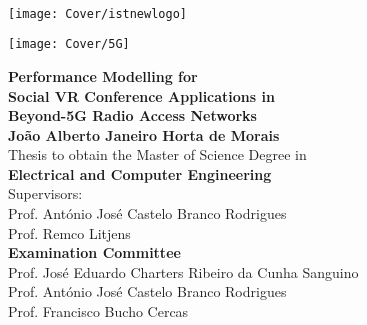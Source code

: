 \setcounter{page}{1} 


\thispagestyle{empty}
\begin{flushleft} ~\\ \vspace{-12mm} \hspace{-12mm}  \texttt{[image: Cover/istnewlogo]} 
\vspace{10mm}
\\ \begin{center} \texttt{[image: Cover/5G]}  \end{center} %
 \vspace{5mm}
\centering
\LARGE \textbf{Performance Modelling for \\Social VR Conference Applications in\\Beyond-5G Radio Access Networks}
\\ \vspace{15mm}
\Large \textbf{Jo{\~a}o Alberto Janeiro Horta de Morais} \\
\vspace{15mm}
\large Thesis to obtain the Master of Science Degree in
\\ \vspace{2mm}
\LARGE \textbf{Electrical and Computer Engineering}
\\ \vspace{10mm}
\large Supervisors:\\
Prof. Ant{\'o}nio Jos{\'e} Castelo Branco Rodrigues \\
Prof. Remco Litjens \\   
\vspace{8mm}
\Large \textbf{Examination Committee}\\ 
\vspace{4mm}
\large
Prof. Jos{\'e} Eduardo Charters Ribeiro da Cunha Sanguino \\
Prof. Ant{\'o}nio Jos{\'e} Castelo Branco Rodrigues \\
Prof. Francisco Bucho Cercas \\


\begin{comment}
\begin{tabular}{rl}
    Supervisors: & Prof. Ant{\'o}nio Jos{\'e} Castelo Branco Rodrigues \\
    & Prof. Remco Litjens \\   
\end{tabular}


\end{comment}
\end{flushleft}
